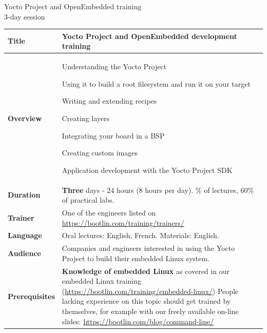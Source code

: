 \documentclass[a4paper,12pt,obeyspaces,spaces,hyphens]{article}
\begin{document}
\thispagestyle{fancy}

\setlength{\arrayrulewidth}{0.8pt}

\begin{center}
\LARGE
Yocto Project and OpenEmbedded training\\
\large
3-day session
\end{center}
\vspace{1cm}

\small
{}

 {
  \begin{tabularx}{\textwidth}{|g|h|}
    {\bf Title} & {\bf Yocto Project and OpenEmbedded development training} \\
    \hline

    {\bf Overview} &
    Understanding the Yocto Project \par
    Using it to build a root filesystem and run it on your target \par
    Writing and extending recipes \par
    Creating layers \par
    Integrating your board in a BSP \par
    Creating custom images \par
    Application development with the Yocto Project SDK \\
    \hline

    {\bf Duration} & {\bf Three} days - 24 hours (8 hours per day).
    \% of lectures, 60\% of practical labs. \\
    \hline

    {\bf Trainer} & One of the engineers listed on
    \newline \url{https://bootlin.com/training/trainers/}\\
    \hline

    {\bf Language} & Oral lectures: English, French.
    \newline Materials: English.\\
    \hline

    {\bf Audience} & Companies and engineers interested in using
    the Yocto Project to build their embedded Linux system.\\
    \hline

    {\bf Prerequisites} & {\bf Knowledge of embedded Linux} as covered
    in our embedded Linux training
    (\url{https://bootlin.com/training/embedded-linux/}) \vspace{1em}
    \newline People lacking experience on this topic should get
    trained by themselves, for example with our freely available
    on-line slides:
    \url{https://bootlin.com/blog/command-line/} \\
    \hline
  \end{tabularx}

}
\end{document}
